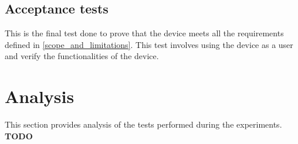 \subsection{Acceptance tests}
This is the final test done to prove that the device meets all the requirements defined in \cref{scope_and_limitations}. This test involves using the device as a user and verify the functionalities of the device. 
\section{Analysis}
This section provides analysis of the tests performed during the experiments. 
{\bf TODO}
